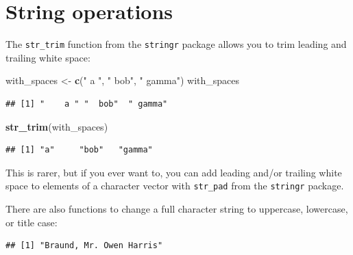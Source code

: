 \documentclass[]{book}
\makeatletter
\newenvironment{Shaded}{\begin{snugshade}}{\end{snugshade}}
\newcommand{\KeywordTok}[1]{\textcolor[rgb]{0.13,0.29,0.53}{\textbf{#1}}}
\newcommand{\DecValTok}[1]{\textcolor[rgb]{0.00,0.00,0.81}{#1}}
\newcommand{\StringTok}[1]{\textcolor[rgb]{0.31,0.60,0.02}{#1}}
\newcommand{\OperatorTok}[1]{\textcolor[rgb]{0.81,0.36,0.00}{\textbf{#1}}}
\newcommand{\NormalTok}[1]{#1}
\newenvironment{kframe}{%
\medskip{}
\setlength{\fboxsep}{.8em}
 \def\at@end@of@kframe{}%
 \ifinner\ifhmode%
  \def\at@end@of@kframe{\end{minipage}}%
  \begin{minipage}{\columnwidth}%
 \fi\fi%
 \def\FrameCommand##1{\hskip\@totalleftmargin \hskip-\fboxsep
 \colorbox{shadecolor}{##1}\hskip-\fboxsep
     \hskip-\linewidth \hskip-\@totalleftmargin \hskip\columnwidth}%
 \MakeFramed {\advance\hsize-\width
   \@totalleftmargin\z@ \linewidth\hsize
   \@setminipage}}%
 {\par\unskip\endMakeFramed%
 \at@end@of@kframe}
\renewenvironment{Shaded}{\begin{kframe}}{\end{kframe}}
\theoremstyle{definition}
\theoremstyle{definition}
\theoremstyle{definition}
\theoremstyle{remark}
\makeatother
\begin{document}
\section{String operations}\label{string-operations}

The \texttt{str\_trim} function from the \texttt{stringr} package allows
you to trim leading and trailing white space:

\begin{Shaded}
\begin{Highlighting}[]
\NormalTok{with_spaces <-}\StringTok{ }\KeywordTok{c}\NormalTok{(}\StringTok{"    a "}\NormalTok{, }\StringTok{"  bob"}\NormalTok{, }\StringTok{" gamma"}\NormalTok{)}
\NormalTok{with_spaces}
\end{Highlighting}
\end{Shaded}

\begin{verbatim}
## [1] "    a " "  bob"  " gamma"
\end{verbatim}

\begin{Shaded}
\begin{Highlighting}[]
\KeywordTok{str_trim}\NormalTok{(with_spaces)}
\end{Highlighting}
\end{Shaded}

\begin{verbatim}
## [1] "a"     "bob"   "gamma"
\end{verbatim}

This is rarer, but if you ever want to, you can add leading and/or
trailing white space to elements of a character vector with
\texttt{str\_pad} from the \texttt{stringr} package.

There are also functions to change a full character string to uppercase,
lowercase, or title case:

\begin{Shaded}
\end{Shaded}

\begin{verbatim}
## [1] "Braund, Mr. Owen Harris"
\end{verbatim}

\begin{Shaded}
\end{Shaded}
\end{document}
